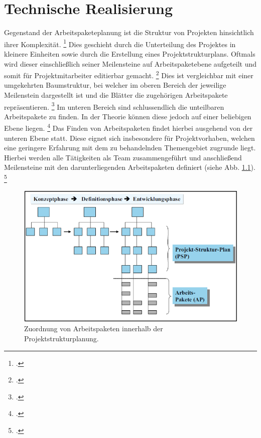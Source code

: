 \chapter{Technische Realisierung}
Gegenstand der Arbeitspaketeplanung ist die Struktur von Projekten hinsichtlich ihrer Komplexität.
\footcite[Vgl.][128]{kusterHandbuchProjektmanagementAgil2022}
Dies geschieht durch die Unterteilung des Projektes in kleinere Einheiten sowie durch die Erstellung eines Projektstrukturplans.
Oftmals wird dieser einschließlich seiner Meilensteine auf Arbeitspaketebene aufgeteilt und somit für Projektmitarbeiter editierbar gemacht.
\footcite[Vgl.][121]{panagosToolsUndMassnahmen2019}
Dies ist vergleichbar mit einer umgekehrten Baumstruktur, bei welcher im oberen Bereich der jeweilige Meilenstein dargestellt ist und die Blätter die
zugehörigen Arbeitspakete repräsentieren.
\footcite[Vgl.][29]{kusay-merkleAgilesProjektmanagementIm2018}
Im unteren Bereich sind schlussendlich die unteilbaren Arbeitspakete zu finden. In der Theorie können diese jedoch auf einer beliebigen Ebene liegen.
\footcite[Vgl.][73]{gadatschGrundkursITProjektcontrollingGrundlagen2008}
Das Finden von Arbeitspaketen findet hierbei ausgehend von der unteren Ebene statt.
Diese eignet sich insbesondere für Projektvorhaben, welchen eine geringere Erfahrung mit dem zu behandelnden Themengebiet zugrunde liegt.
Hierbei werden alle Tätigkeiten als Team zusammengeführt und anschließend Meilensteine mit den darunterliegenden Arbeitspaketen
definiert (siehe Abb. \ref{abb:psp}).
\footcite[Vgl.][133]{kusterHandbuchProjektmanagementAgil2022}
\begin{figure}[H]
    \centering
    \includegraphics[width=0.47\linewidth]{graphics/psp.png}
    \caption{Zuordnung von Arbeitspaketen innerhalb der Projektstrukturplanung.}\label{abb:psp}
\end{figure}
